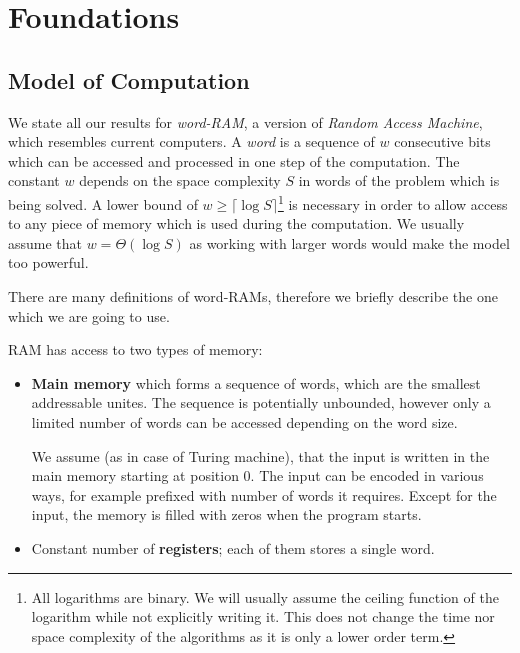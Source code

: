 \chapter{Foundations}

\section{Model of Computation}

We state all our results for \emph{word-RAM}, a version of \emph{Random Access Machine}, which resembles current computers.
A \emph{word} is a sequence of $w$ consecutive bits which can be accessed and processed in one step of the computation.
The constant $w$ depends on the space complexity $S$ in words of the problem which is being solved.
A lower bound of $w \ge \lceil \log S \rceil$\footnote{
	All logarithms are binary. 
	We will usually assume the ceiling function of the logarithm while not explicitly writing it.
	This does not change the time nor space complexity of the algorithms as it is only a lower order term.
}
 is necessary in order to allow access to any piece of memory which is used during the computation.
We usually assume that $w = \Theta(\log S)$ as working with larger words would make the model too powerful.

\bigbreak

There are many definitions of word-RAMs, therefore we briefly describe the one which we are going to use.

RAM has access to two types of memory:
\begin{itemize}
	\item \textbf{Main memory} which forms a sequence of words, which are the smallest addressable unites.
	The sequence is potentially unbounded, however only a limited number of words can be accessed depending on the word size.
	
	We assume (as in case of Turing machine), that the input is written in the main memory starting at position $0$.
	The input can be encoded in various ways, for example prefixed with number of words it requires.
	Except for the input, the memory is filled with zeros when the program starts.
	
	\item Constant number of \textbf{registers}; each of them stores a single word.
\end{itemize}

